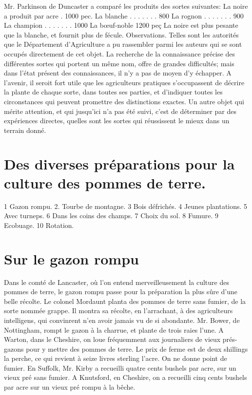 Mr. Parkinson de Duncaster a comparé les produits des sortes suivantes:
La noire a produit par acre . 1000 pec.
La blanche . . . . . . . 800
La rognon . . . . . . . 900
La champion . . . . . . . 1000\setcounter{page}{266} La bœuf-noble 1200 peç
La noire est plus pesante que la blanche, et fournit plus de fécule.
Observations.
Telles sont les autorités que le Département d'Agriculture a pu rassembler parmi les auteurs qui se sont occupés directement de cet objet. La recherche de la connaissance précise des différentes sortes qui portent un même nom, offre de grandes difficultés; mais dans l'état présent des connaissances, il n'y a pas de moyen d'y échapper. A l'avenir, il seroit fort utile que les agriculteurs pratiques s'occupassent de décrire la plante de chaque sorte, dans toutes ses parties, et d'indiquer toutes les circonstances qui peuvent promettre des distinctions exactes. Un autre objet qui mérite attention, et qui jusqu'ici n'a pas été suivi, c'est de déterminer par des expériences directes, quelles sont les sortes qui réussissent le mieux dans un terrain donné.
\section{Des diverses préparations pour la culture des pommes de terre.}
1 Gazon rompu.
2. Tourbe de montagne.\setcounter{page}{267} 3 Bois défrichés.
4 Jeunes plantations.
5 Avec turneps.
6 Dans les coins des champs.
7 Choix du sol.
8 Fumure.
9 Ecobuage.
10 Rotation.
\section{Sur le gazon rompu}
Dans le comté de Lancaster, où l'on entend merveilleusement la culture des pommes de terre, le gazon rompu passe pour la préparation la plus sûre d'une belle récolte.
Le colonel Mordaunt planta des pommes de terre sans fumier, de la sorte nommée grappe. Il montra sa récolte, en l'arrachant, à des agriculteurs intelligens, qui convinrent n'en avoir jamais vu de si abondante.
Mr. Bower, de Nottingham, rompt le gazon à la charrue, et plante de trois raies l'une.
A Warton, dans le Cheshire, on loue fréquemment aux journaliers de vieux prés-gazons pour y mettre des pommes de terre. Le prix de ferme est de deux shillings la perche, ce qui revient à seize livres sterling l'acre. On ne donne point de fumier.\setcounter{page}{268} En Suffolk, Mr. Kirby a recueilli quatre cents bushels par acre, sur un vieux pré sans fumier.
A Knutsford, en Cheshire, on a recueilli cinq cents bushels par acre sur un vieux pré rompu à la bêche.
